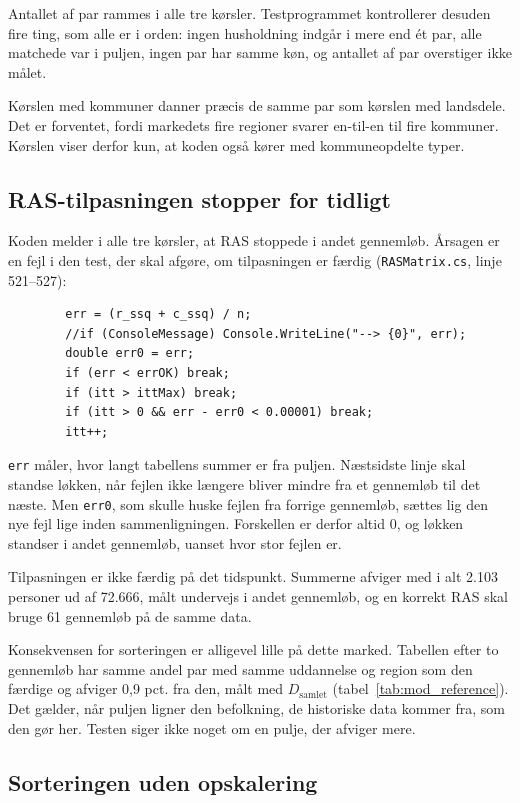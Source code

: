\documentclass[11pt,a4paper]{article}
\newcommand{\kode}[1]{\texttt{#1}}
\begin{document}
Antallet af par rammes i alle tre kørsler. Testprogrammet kontrollerer desuden fire ting, som alle er
i orden: ingen husholdning indgår i mere end ét par, alle matchede var i puljen, ingen par har samme
køn, og antallet af par overstiger ikke målet.

Kørslen med kommuner danner præcis de samme par som kørslen med landsdele. Det er forventet, fordi
markedets fire regioner svarer en-til-en til fire kommuner. Kørslen viser derfor kun, at koden også
kører med kommuneopdelte typer.

\subsection{RAS-tilpasningen stopper for tidligt}\label{sec:ras}

Koden melder i alle tre kørsler, at RAS stoppede i andet gennemløb. Årsagen er en fejl i den test,
der skal afgøre, om tilpasningen er færdig (\kode{RASMatrix.cs}, linje 521--527):

{\small
\begin{verbatim}
        err = (r_ssq + c_ssq) / n;
        //if (ConsoleMessage) Console.WriteLine("--> {0}", err);
        double err0 = err;
        if (err < errOK) break;
        if (itt > ittMax) break;
        if (itt > 0 && err - err0 < 0.00001) break;
        itt++;
\end{verbatim}
}

\kode{err} måler, hvor langt tabellens summer er fra puljen. Næstsidste linje skal standse løkken,
når fejlen ikke længere bliver mindre fra et gennemløb til det næste. Men \kode{err0}, som skulle
huske fejlen fra forrige gennemløb, sættes lig den nye fejl lige inden sammenligningen. Forskellen er
derfor altid 0, og løkken standser i andet gennemløb, uanset hvor stor fejlen er.

Tilpasningen er ikke færdig på det tidspunkt. Summerne afviger med i alt 2.103 personer ud af 72.666,
målt undervejs i andet gennemløb, og en korrekt RAS skal bruge 61 gennemløb på de samme data.

Konsekvensen for sorteringen er alligevel lille på dette marked. Tabellen efter to gennemløb har
samme andel par med samme uddannelse og region som den færdige og afviger 0,9 pct. fra den, målt med
$D_{\text{samlet}}$ (tabel~\ref{tab:mod_reference}). Det gælder, når puljen ligner den befolkning,
de historiske data kommer fra, som den gør her. Testen siger ikke noget om en pulje, der afviger
mere.

\subsection{Sorteringen uden opskalering}
\end{document}
